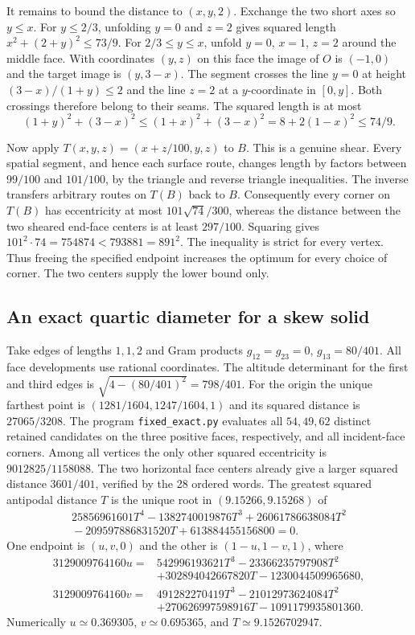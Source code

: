 \documentclass[10pt,letterpaper]{article}
\begin{document}
It remains to bound the distance to $(x,y,2)$. Exchange the two short axes
so $y\le x$. For $y\le2/3$, unfolding $y=0$ and $z=2$ gives squared length
$x^2+(2+y)^2\le73/9$. For $2/3\le y\le x$, unfold $y=0$, $x=1$, $z=2$
around the middle face. With coordinates $(y,z)$ on this face the image of
$O$ is $(-1,0)$ and the target image is $(y,3-x)$. The segment crosses
the line $y=0$ at height $(3-x)/(1+y)\le2$ and the line $z=2$ at a
$y$-coordinate in $[0,y]$. Both crossings therefore belong to their seams.
The squared length is at most
\[
 (1+y)^2+(3-x)^2\le(1+x)^2+(3-x)^2
 =8+2(1-x)^2\le74/9.
\]

Now apply $T(x,y,z)=(x+z/100,y,z)$ to $B$. This is a genuine shear. Every
spatial segment, and hence each surface route, changes length by factors
between $99/100$ and $101/100$, by the triangle and reverse triangle
inequalities. The inverse transfers arbitrary routes on $T(B)$ back to $B$.
Consequently every corner on $T(B)$ has eccentricity at most
$101\sqrt{74}/300$, whereas the distance between the two sheared end-face
centers is at least $297/100$. Squaring gives
$101^2\cdot74=754874<793881=891^2$. The inequality is strict for every
vertex. Thus freeing the specified endpoint increases the optimum for every choice of corner. The two centers supply the lower bound only.

\subsection{An exact quartic diameter for a skew solid}
\label{sec:worked-quartic}
Take edges of lengths $1,1,2$ and Gram products
$g_{12}=g_{23}=0$, $g_{13}=80/401$. All face developments use
rational coordinates. The altitude determinant for the first and
third edges is $\sqrt{4-(80/401)^2}=798/401$.
For the origin the unique farthest point is $(1281/1604,1247/1604,1)$ and its squared distance is $27065/3208$. The program \texttt{fixed\_exact.py} evaluates all $54,49,62$ distinct retained candidates on the three positive faces, respectively, and all incident-face corners.
Among all vertices the only other squared eccentricity is
$9012825/1158088$. The two horizontal face centers already give a
larger squared distance $3601/401$, verified by the 28 ordered words.
The greatest squared antipodal distance $T$ is the unique root in
$(9.15266,9.15268)$ of
\[
\begin{split}
 25856961601T^4-1382740019876T^3+26061786638084T^2\\
 {}-209597886831520T+613884455156800=0 .
\end{split}
\]
One endpoint is $(u,v,0)$ and the other is $(1-u,1-v,1)$, where
\[
\begin{aligned}
3129009764160u={}&542996193621T^3-23366235797908T^2\\
                  &+302894042667820T-1230044509965680,\\
3129009764160v={}&491282270419T^3-21012973624084T^2\\
                  &+270626997598916T-1091179935801360.
\end{aligned}
\]
Numerically $u\simeq0.369305$, $v\simeq0.695365$, and $T\simeq9.1526702947$.
\end{document}
